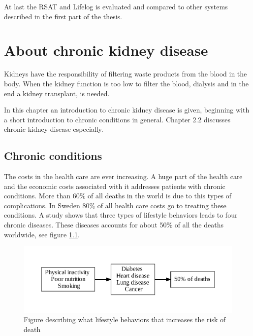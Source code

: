 \documentclass{cslthse-msc}
\begin{document}
At last the RSAT and Lifelog is evaluated and compared to other systems described in the first part of the thesis.




\chapter{About chronic kidney disease}

Kidneys have the responsibility of filtering waste products from the blood in the body\cite{NKDEPBASICS}. When the kidney function is too low to filter the blood, dialysis and in the end a kidney transplant, is needed.

In this chapter an introduction to chronic kidney disease is given, beginning with a short introduction to chronic conditions in general. Chapter 2.2 discusses chronic kidney disease especially.
  
\section{Chronic conditions}

The costs in the health care are ever increasing. A huge part of the health care and the economic costs associated with it addresses patients with chronic conditions. More than 60\% of all deaths in the world is due to this types of complications. In Sweden 80\% of all health care costs go to treating these conditions\cite{SmartCare}. A study shows that three types of lifestyle behaviors  leads to four chronic diseases. These diseases accounts for about 50\% of all the deaths worldwide, see figure \ref{fig:chronic-fig}\cite{callaway2015quantified}.

\begin{figure}[!hbt]
\centering
\includegraphics[scale=0.8]{chronic-fig.pdf} 
\caption{Figure  describing what lifestyle behaviors that increases the risk of death}\label{fig:chronic-fig}
\end{figure}
\end{document}
